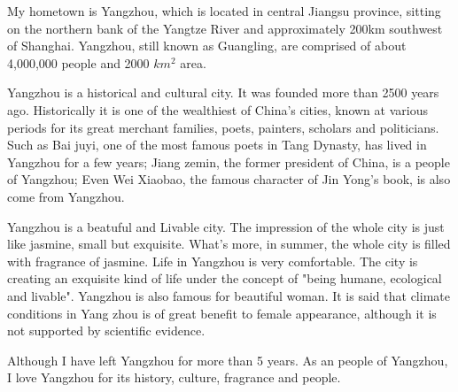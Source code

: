 \documentclass[12pt,a4paper]{caspset}
\begin{document}

My hometown is Yangzhou, which is located in central Jiangsu province, sitting on the northern bank of the Yangtze River and approximately 200km southwest of Shanghai. Yangzhou, still known as Guangling, are comprised of about 4,000,000 people and 2000 $km^2$ area.

Yangzhou is a historical and cultural city. It was founded more than 2500 years ago. Historically it is one of the wealthiest of China's cities, known at various periods for its great merchant families, poets, painters, scholars and politicians. Such as Bai juyi, one of the most famous poets in Tang Dynasty, has lived in Yangzhou for a few years; Jiang zemin, the former president of China, is a people of Yangzhou; Even Wei Xiaobao, the famous character of Jin Yong’s book, is also come from Yangzhou. 

Yangzhou is a beatuful and Livable city. The impression of the whole city is just like jasmine, small but exquisite. What's more, in summer, the whole city is filled with fragrance of jasmine. Life in Yangzhou is very comfortable. The city is creating an exquisite kind of life under the concept of "being humane, ecological and livable". Yangzhou is also famous for beautiful woman. It is said that climate conditions in Yang zhou is of great benefit to female appearance, although it is not supported by scientific evidence.

Although I have left Yangzhou for more than 5 years. As an people of Yangzhou, I love Yangzhou for its history, culture, fragrance and people. 
\end{document}

